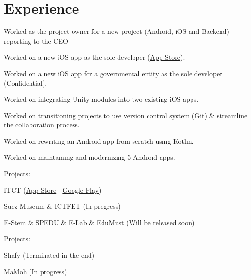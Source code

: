 \documentclass[]{Resume}
\begin{document}
\begin{minipage}[t]{0.66\textwidth} 


\section{Experience}
\vspace{\topsep} %
\begin{tightemize}
\item Worked as the project owner for a new project (Android, iOS and Backend) reporting to the CEO
\item Worked on a new iOS app as the sole developer (\href{http://apps.apple.com/eg/app/ritmo/id1366842426}{App Store}).
\item Worked on a new iOS app for a governmental entity as the sole developer (Confidential).
\item Worked on integrating Unity modules into two existing iOS apps.
\item Worked on transitioning projects to use version control system (Git) \& streamline the collaboration process.
\item Worked on rewriting an Android app from scratch using Kotlin.
\item Worked on maintaining and modernizing 5 Android apps.
\end{tightemize}
\sectionsep

Projects:\\
\begin{tightemize}
\item ITCT (\href{https://apps.apple.com/eg/app/itct/id1457627257}{App Store} | \href{https://play.google.com/store/apps/details?id=com.asugards.itct}{Google Play})
\item Suez Museum \& ICTFET (In progress)
\item E-Stem \& SPEDU \& E-Lab \& EduMust (Will be released soon)
\end{tightemize}

\vspace{\topsep}

Projects:\\
\begin{tightemize}
\item Shafy (Terminated in the end)\\
\item MaMoh (In progress)
\end{tightemize}


\end{minipage}
\end{document}
